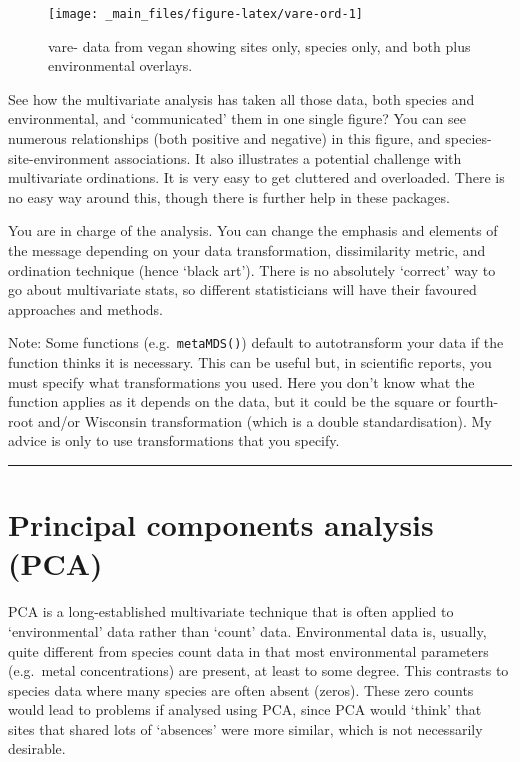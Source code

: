 \documentclass[
  11pt,
  a4paper,
]{book}
\begin{document}
\begin{figure}

{\centering \texttt{[image: \_main\_files/figure-latex/vare-ord-1]} 

}

\caption{vare- data from vegan showing sites only, species only, and both plus environmental overlays.}\label{fig:vare-ord}
\end{figure}

See how the multivariate analysis has taken all those data, both species and environmental, and `communicated' them in one single figure? You can see numerous relationships (both positive and negative) in this figure, and species-site-environment associations. It also illustrates a potential challenge with multivariate ordinations. It is very easy to get cluttered and overloaded. There is no easy way around this, though there is further help in these packages.

You are in charge of the analysis. You can change the emphasis and elements of the message depending on your data transformation, dissimilarity metric, and ordination technique (hence `black art'). There is no absolutely `correct' way to go about multivariate stats, so different statisticians will have their favoured approaches and methods.

Note: Some functions (e.g.~\texttt{metaMDS()}) default to autotransform your data if the function thinks it is necessary. This can be useful but, in scientific reports, you must specify what transformations you used. Here you don't know what the function applies as it depends on the data, but it could be the square or fourth-root and/or Wisconsin transformation (which is a double standardisation). My advice is only to use transformations that you specify.

\begin{center}\rule{0.5\linewidth}{0.5pt}\end{center}

\hypertarget{principal-components-analysis-pca}{%
\section{Principal components analysis (PCA)}\label{principal-components-analysis-pca}}

PCA is a long-established multivariate technique that is often applied to `environmental' data rather than `count' data. Environmental data is, usually, quite different from species count data in that most environmental parameters (e.g.~metal concentrations) are present, at least to some degree. This contrasts to species data where many species are often absent (zeros). These zero counts would lead to problems if analysed using PCA, since PCA would `think' that sites that shared lots of `absences' were more similar, which is not necessarily desirable.
\end{document}
